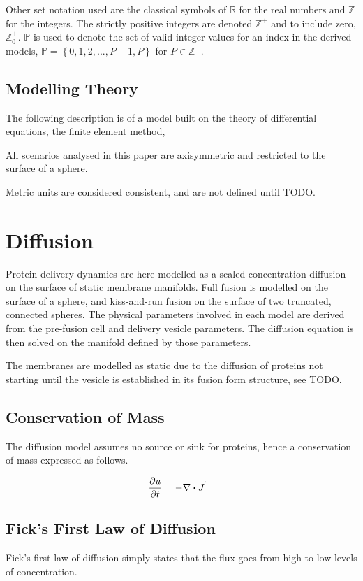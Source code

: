 \documentclass{report}
\newcommand\Brace[1]{{ \left\{{#1}\right\} }}
\newcommand\bbP{{ \mathbb{P} }}
\newcommand\bbR{{ \mathbb{R} }}
\newcommand\bbZ{{ \mathbb{Z} }}
\begin{document}
Other set notation used are the classical symbols of $\bbR$ for the real numbers and $\bbZ$ for the integers. The strictly positive integers are denoted $\bbZ^+$ and to include zero, $\bbZ_0^+$. $\bbP$ is used to denote the set of valid integer values for an index in the derived models, $\bbP = \Brace{0, 1, 2, ..., P-1, P}$ for $P \in \bbZ^+$.

\section{Modelling Theory}
The following description is of a model built on the theory of differential equations, the finite element method, 

All scenarios analysed in this paper are axisymmetric and restricted to the surface of a sphere.

Metric units are considered consistent, and are not defined until TODO.

\chapter{Diffusion}
Protein delivery dynamics are here modelled as a scaled concentration diffusion on the surface of static membrane manifolds. Full fusion is modelled on the surface of a sphere, and kiss-and-run fusion on the surface of two truncated, connected spheres. The physical parameters involved in each model are derived from the pre-fusion cell and delivery vesicle parameters. The diffusion equation is then solved on the manifold defined by those parameters.

The membranes are modelled as static due to the diffusion of proteins not starting until the vesicle is established in its fusion form structure, see TODO.

\section{Conservation of Mass}
The diffusion model assumes no source or sink for proteins, hence a conservation of mass expressed as follows.

\begin{align*}
	\pdv{u}{t} &= -\nabla \dotproduct \vec{J}
\end{align*}

\section{Fick's First Law of Diffusion}
Fick's first law of diffusion simply states that the flux goes from high to low levels of concentration.
\end{document}
